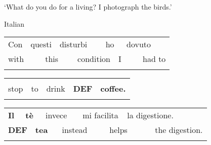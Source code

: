 \begin{styleTranslation}
‘What do you do for a living? I photograph the birds.’

\end{styleTranslation}

\begin{listWWNumileveli}
\item {}

\begin{styleExample}
Italian

\end{styleExample}

\end{listWWNumileveli}

\begin{tabular}{llllllllll}
\lsptoprule
Con & \multicolumn{2}{l}{questi

} & \multicolumn{2}{l}{disturbi

} & \multicolumn{2}{l}{ho

} & \multicolumn{2}{l}{dovuto

} & \\
\multicolumn{2}{l}{with

} & \multicolumn{2}{l}{this

} & \multicolumn{2}{l}{condition

} & \multicolumn{2}{l}{I

} & \multicolumn{2}{l}{had to

}\\
\lspbottomrule
\end{tabular}

\begin{tabular}{lllll}
\lsptoprule
\multicolumn{5}{l}{smettere

}\\
stop & to & drink & {\bfseries DEF} & {\bfseries coffee.}\\
\lspbottomrule
\end{tabular}

\begin{tabular}{llllllllll}
\lsptoprule
{\bfseries Il} & \multicolumn{2}{l}{{\bfseries tè}

} & \multicolumn{2}{l}{invece

} & \multicolumn{2}{l}{mi facilita

} & \multicolumn{2}{l}{la digestione.

} & \\
\multicolumn{2}{l}{{\bfseries DEF}

} & \multicolumn{2}{l}{{\bfseries tea}

} & \multicolumn{2}{l}{instead

} & \multicolumn{2}{l}{helps

} & \multicolumn{2}{l}{the digestion.

}\\
\lspbottomrule
\end{tabular}

